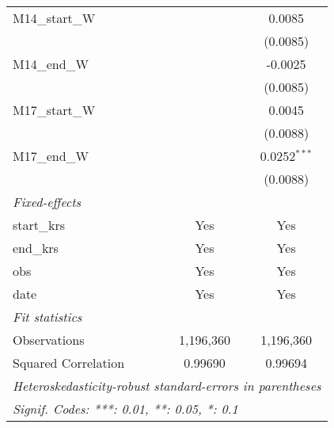 \documentclass[10pt,a4paper]{article}
\begin{document}
\begin{tabular}{lcc}
   M14\_start\_W                                    &                 & 0.0085\\   
                                                    &                 & (0.0085)\\   
   M14\_end\_W                                      &                 & -0.0025\\   
                                                    &                 & (0.0085)\\   
   M17\_start\_W                                    &                 & 0.0045\\   
                                                    &                 & (0.0088)\\   
   M17\_end\_W                                      &                 & 0.0252$^{***}$\\   
                                                    &                 & (0.0088)\\   
   \midrule
   \emph{Fixed-effects}\\
   start\_krs                                       & Yes             & Yes\\  
   end\_krs                                         & Yes             & Yes\\  
   obs                                              & Yes             & Yes\\  
   date                                             & Yes             & Yes\\  
   \midrule
   \emph{Fit statistics}\\
   Observations                                     & 1,196,360       & 1,196,360\\  
   Squared Correlation                              & 0.99690         & 0.99694\\  
   \midrule \midrule
   \multicolumn{3}{l}{\emph{Heteroskedasticity-robust standard-errors in parentheses}}\\
   \multicolumn{3}{l}{\emph{Signif. Codes: ***: 0.01, **: 0.05, *: 0.1}}\\
\end{tabular}
\par\endgroup
\end{document}
